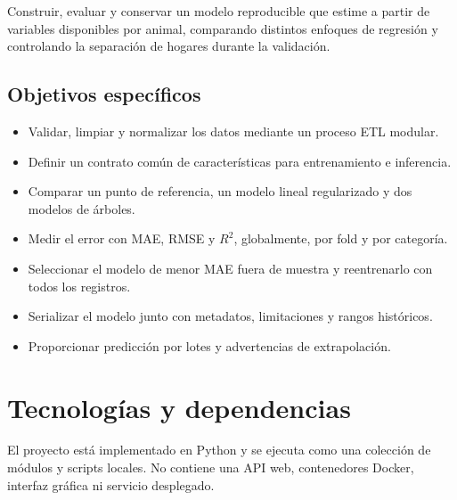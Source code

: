 \documentclass[11pt,a4paper]{article}
\newcommand{\archivo}[1]{\texttt{\detokenize{#1}}}
\begin{document}
Construir, evaluar y conservar un modelo reproducible que estime \archivo{dmi_kg_dia} a partir de variables disponibles por animal, comparando distintos enfoques de regresión y controlando la separación de hogares durante la validación.

\subsection{Objetivos específicos}
\begin{itemize}
  \item Validar, limpiar y normalizar los datos mediante un proceso ETL modular.
  \item Definir un contrato común de características para entrenamiento e inferencia.
  \item Comparar un punto de referencia, un modelo lineal regularizado y dos modelos de árboles.
  \item Medir el error con MAE, RMSE y $R^2$, globalmente, por fold y por categoría.
  \item Seleccionar el modelo de menor MAE fuera de muestra y reentrenarlo con todos los registros.
  \item Serializar el modelo junto con metadatos, limitaciones y rangos históricos.
  \item Proporcionar predicción por lotes y advertencias de extrapolación.
\end{itemize}

\section{Tecnologías y dependencias}

El proyecto está implementado en Python y se ejecuta como una colección de módulos y scripts locales. No contiene una API web, contenedores Docker, interfaz gráfica ni servicio desplegado.
\end{document}
